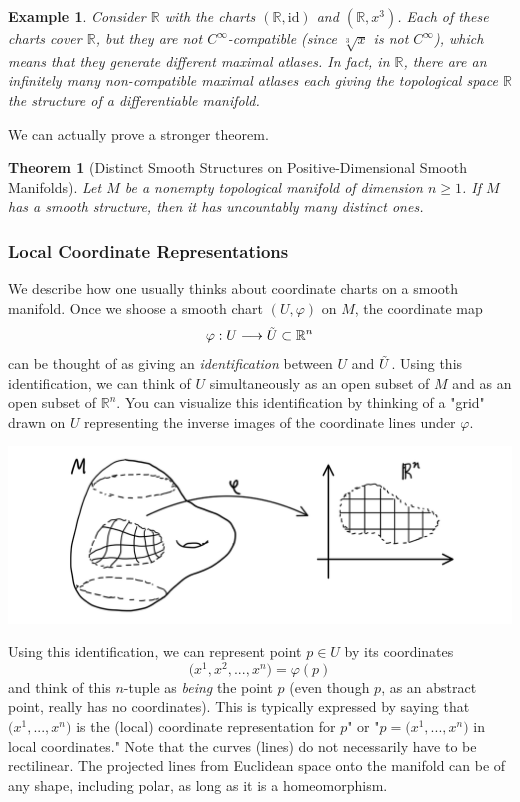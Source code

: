\documentclass{article}
\newtheorem{theorem}{Theorem}[section]
\newtheorem{example}{Example}[section]
\theoremstyle{remark}
\theoremstyle{definition}
\begin{document}
\begin{example}
Consider $\mathbb{R}$ with the charts $(\mathbb{R}, \text{id})$ and $(\mathbb{R}, x^3)$. Each of these charts cover $\mathbb{R}$, but they are not $C^\infty$-compatible (since $\sqrt[3]{x}$ is not $C^\infty$), which means that they generate different maximal atlases. In fact, in $\mathbb{R}$, there are an infinitely many non-compatible maximal atlases each giving the topological space $\mathbb{R}$ the structure of a differentiable manifold. 
\end{example}

We can actually prove a stronger theorem. 

\begin{theorem}[Distinct Smooth Structures on Positive-Dimensional Smooth Manifolds]
Let $M$ be a nonempty topological manifold of dimension $n \geq 1$. If $M$ has a smooth structure, then it has uncountably many distinct ones. 
\end{theorem}

\subsubsection{Local Coordinate Representations}
We describe how one usually thinks about coordinate charts on a smooth manifold. Once we shoose a smooth chart $(U, \varphi)$ on $M$, the coordinate map 
\[\varphi: U \longrightarrow \Tilde{U} \subset \mathbb{R}^n\]
can be thought of as giving an \textit{identification} between $U$ and $\Tilde{U}$. Using this identification, we can think of $U$ simultaneously as an open subset of $M$ and as an open subset of $\mathbb{R}^n$. You can visualize this identification by thinking of a "grid" drawn on $U$ representing the inverse images of the coordinate lines under $\varphi$. 
\begin{center}
    \includegraphics[scale=0.25]{img/Grid_Identification.PNG}
\end{center}
Using this identification, we can represent point $p \in U$ by its coordinates
\[\big( x^1, x^2, ..., x^n \big) = \varphi(p)\]
and think of this $n$-tuple as \textit{being} the point $p$ (even though $p$, as an abstract point, really has no coordinates). This is typically expressed by saying that $\big( x^1, ..., x^n\big)$ is the (local) coordinate representation for $p$" or "$p = \big( x^1, ..., x^n\big)$ in local coordinates." Note that the curves (lines) do not necessarily have to be rectilinear. The projected lines from Euclidean space onto the manifold can be of any shape, including polar, as long as it is a homeomorphism. 
\end{document}
